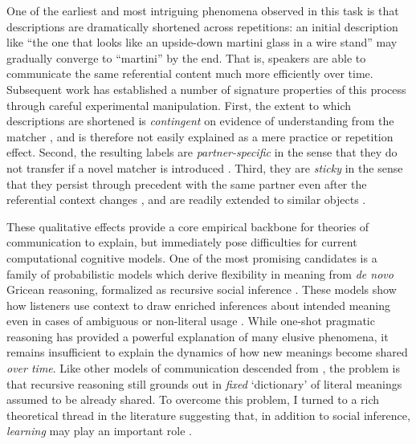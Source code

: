 \documentclass[11pt]{article}
\begin{document}
One of the earliest and most intriguing phenomena observed in this task is that descriptions are dramatically shortened across repetitions: an initial description like ``the one that looks like an upside-down martini glass in a wire stand'' may gradually converge to ``martini'' by the end.
That is, speakers are able to communicate the same referential content much more efficiently over time.
Subsequent work has established a number of signature properties of this process through careful experimental manipulation.
First, the extent to which descriptions are shortened is \emph{contingent} on evidence of understanding from the matcher , and is therefore not easily explained as a mere practice or repetition effect.
Second, the resulting labels are \emph{partner-specific} in the sense that they do not transfer if a novel matcher is introduced .
Third, they are \emph{sticky} in the sense that they persist through precedent with the same partner even after the referential context changes \cite{BrennanClark96_ConceptualPactsConversation}, and are readily extended to similar objects \cite{MarkmanMakin98_ReferentialCommunicationCategory}.

These qualitative effects provide a core empirical backbone for theories of communication to explain, but immediately pose difficulties for current computational cognitive models.
One of the most promising candidates is a family of probabilistic models which derive flexibility in meaning from \emph{de novo} Gricean reasoning, formalized as recursive social inference \cite{GoodmanFrank16_RSATiCS,FrankeJager16_ProbabilisticPragmatics}.
These models show how listeners use context to draw enriched inferences about intended meaning even in cases of ambiguous or non-literal usage \cite{Clark83_NonceSense,LascaridesCopestake98_PragmaticsWordMeaning,Glucksberg01_FigurativeLanguage}.
While one-shot pragmatic reasoning has provided a powerful explanation of many elusive phenomena, it remains insufficient to explain the dynamics of how new meanings become shared \emph{over time}.
Like other models of communication descended from , the problem is that recursive reasoning still grounds out in \emph{fixed}  `dictionary' of literal meanings assumed to be already shared.
To overcome this problem, I turned to a rich theoretical thread in the literature suggesting that, in addition to social inference, \emph{learning} may play an important role .
\end{document}
